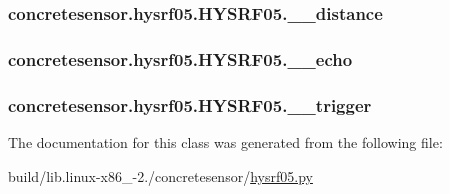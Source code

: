 \subsubsection[{\+\_\+\+\_\+distance}]{\setlength{\rightskip}{0pt plus 5cm}concretesensor.\+hysrf05.\+H\+Y\+S\+R\+F05.\+\_\+\+\_\+distance\hspace{0.3cm}{\ttfamily [private]}}\label{classconcretesensor_1_1hysrf05_1_1HYSRF05_a5d60d1ca2933efdc8a1679b5b21b3279}
\hypertarget{classconcretesensor_1_1hysrf05_1_1HYSRF05_a5d62e7ba8857147943018422ec4e283d}{}
\subsubsection[{\+\_\+\+\_\+echo}]{\setlength{\rightskip}{0pt plus 5cm}concretesensor.\+hysrf05.\+H\+Y\+S\+R\+F05.\+\_\+\+\_\+echo\hspace{0.3cm}{\ttfamily [private]}}\label{classconcretesensor_1_1hysrf05_1_1HYSRF05_a5d62e7ba8857147943018422ec4e283d}
\hypertarget{classconcretesensor_1_1hysrf05_1_1HYSRF05_a565f8ac07d5da57c0c9059ccb6e77455}{}
\subsubsection[{\+\_\+\+\_\+trigger}]{\setlength{\rightskip}{0pt plus 5cm}concretesensor.\+hysrf05.\+H\+Y\+S\+R\+F05.\+\_\+\+\_\+trigger\hspace{0.3cm}{\ttfamily [private]}}\label{classconcretesensor_1_1hysrf05_1_1HYSRF05_a565f8ac07d5da57c0c9059ccb6e77455}


The documentation for this class was generated from the following file\+:\begin{DoxyCompactItemize}
\item 
build/lib.\+linux-\/x86\+\_-\/2./concretesensor/\hyperlink{build_2lib_8linux-x86__64-2_87_2concretesensor_2hysrf05_8py}{hysrf05.\+py}\end{DoxyCompactItemize}

